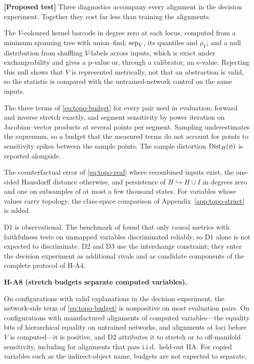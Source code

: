 \documentclass[11pt,a4paper]{article}
\newcommand{\evl}[2]{{\small\bfseries\color{#1}[#2]}}
\newcommand{\LTest}{\evl{ctest}{Proposed test}}
\newenvironment{hypbox}[1]{%
  \def\FrameCommand{{\color{chyp}\vrule width 1.6pt}\hspace{8pt}}%
  \MakeFramed{\advance\hsize-\width\FrameRestore}%
  \noindent\textbf{#1}\par\smallskip\noindent\ignorespaces}{\endMakeFramed}
\begin{document}
\LTest{} Three diagnostics accompany every alignment in the decision
experiment. Together they cost far less than training the alignments.
\begin{description}[style=nextline,leftmargin=1.5em]
\item[D1, network side.] The $V$-coloured kernel barcode in degree zero at each
locus, computed from a minimum spanning tree with union--find; $\operatorname{sep}_V$, its
quantiles and $\rho_V$; and a null distribution from shuffling $V$-labels
across inputs, which is exact under exchangeability and gives a p-value or,
through a calibrator, an e-value. Rejecting this null shows that $V$ is
represented metrically, not that an abstraction is valid, so the statistic is
compared with the untrained-network control on the same inputs.
\item[D2, map side.] The three terms of \eqref{eq:topo-budget} for every pair
used in evaluation: forward and inverse stretch exactly, and segment
sensitivity by power iteration on Jacobian--vector products at several points
per segment. Sampling underestimates the supremum, so a budget that the
measured terms do not account for points to sensitivity spikes between the
sample points. The sample distortion $\operatorname{Dist}_H(\phi)$ is reported alongside.
\item[D3, realizability.] The counterfactual error of \eqref{eq:topo-real}
where recombined inputs exist, the one-sided Hausdorff distance otherwise,
and persistence of $H\hookrightarrow H\cup I$ in degrees zero and one on
subsamples of at most a few thousand states. For variables whose values carry
topology, the class-space comparison of Appendix~\ref{app:topo-struct} is
added.
\end{description}
D1 is observational. The benchmark of \cite{meloux2026} found that only causal
metrics with faithfulness tests on unmapped variables discriminated reliably,
so D1 alone is not expected to discriminate. D2 and D3 use the interchange
constraint; they enter the decision experiment as additional rivals and as
candidate components of the complete protocol of H-A4.

\begin{hypbox}{H-A8 (stretch budgets separate computed variables).}
On configurations with valid explanations in the decision experiment, the
network-side term of \eqref{eq:topo-budget} is nonpositive on most evaluation
pairs. On configurations with manufactured alignments of computed variables---the
equality bits of hierarchical equality on untrained networks, and alignments
at loci before $V$ is computed---it is positive, and D2 attributes it to
stretch or to off-manifold sensitivity, including for alignments that pass
i.i.d.\ held-out IIA. For copied variables such as the indirect-object name,
budgets are not expected to separate.
\end{hypbox}
\end{document}
